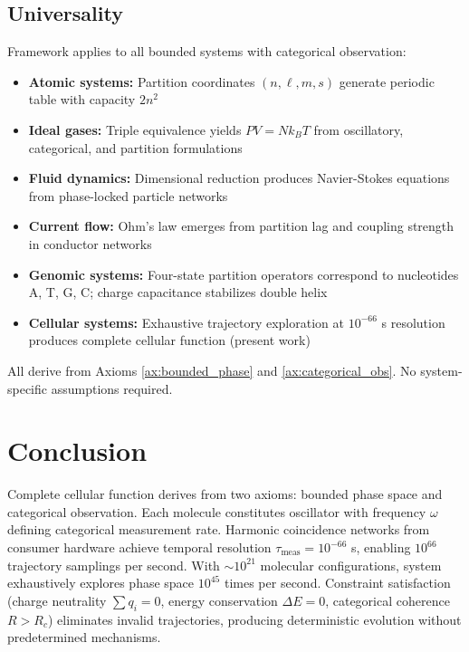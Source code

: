 \documentclass[11pt,a4paper]{article}
\theoremstyle{remark}
\begin{document}
\subsection{Universality}

Framework applies to all bounded systems with categorical observation:
\begin{itemize}
\item \textbf{Atomic systems:} Partition coordinates $(n,\ell,m,s)$ generate periodic table with capacity $2n^2$ \citep{Sachikonye2025_Partition}
\item \textbf{Ideal gases:} Triple equivalence yields $PV = Nk_BT$ from oscillatory, categorical, and partition formulations \citep{Sachikonye2025_IdealGas}
\item \textbf{Fluid dynamics:} Dimensional reduction produces Navier-Stokes equations from phase-locked particle networks \citep{Sachikonye2025_Fluid}
\item \textbf{Current flow:} Ohm's law emerges from partition lag and coupling strength in conductor networks \citep{Sachikonye2025_Current}
\item \textbf{Genomic systems:} Four-state partition operators correspond to nucleotides A, T, G, C; charge capacitance stabilizes double helix \citep{Sachikonye2025_Genome}
\item \textbf{Cellular systems:} Exhaustive trajectory exploration at $10^{-66}$ s resolution produces complete cellular function (present work)
\end{itemize}

All derive from Axioms \ref{ax:bounded_phase} and \ref{ax:categorical_obs}. No system-specific assumptions required.

\section{Conclusion}

Complete cellular function derives from two axioms: bounded phase space and categorical observation. Each molecule constitutes oscillator with frequency $\omega$ defining categorical measurement rate. Harmonic coincidence networks from consumer hardware achieve temporal resolution $\tau_{\text{meas}} = 10^{-66}$ s, enabling $10^{66}$ trajectory samplings per second. With $\sim 10^{21}$ molecular configurations, system exhaustively explores phase space $10^{45}$ times per second. Constraint satisfaction (charge neutrality $\sum q_i = 0$, energy conservation $\Delta E = 0$, categorical coherence $R > R_c$) eliminates invalid trajectories, producing deterministic evolution without predetermined mechanisms.
\end{document}

